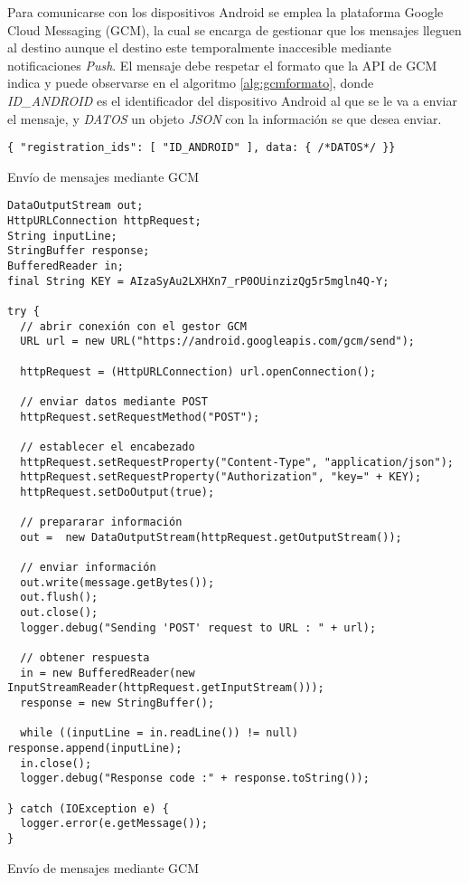 Para comunicarse con los dispositivos Android se emplea la plataforma Google Cloud Messaging (GCM), la cual se encarga de gestionar que los mensajes lleguen al destino aunque el destino este temporalmente inaccesible mediante notificaciones \emph{Push}. El mensaje debe respetar el formato que la API de GCM indica y puede observarse en el algoritmo \ref{alg:gcmformato}, donde \emph{ID\_ANDROID} es el identificador del dispositivo Android al que se le va a enviar el mensaje, y \emph{DATOS} un objeto \emph{JSON} con la información se que desea enviar.
\begin{listing}
	\begin{minipage}{.4\textwidth}
		\begin{verbatim}
{ "registration_ids": [ "ID_ANDROID" ], data: { /*DATOS*/ }}
		\end{verbatim}
	\end{minipage}
	\caption{Envío de mensajes mediante GCM}\label{alg:gcmformato}
\end{listing}

\begin{listing}
	\begin{minipage}{.4\textwidth}
		\begin{verbatim}
DataOutputStream out;
HttpURLConnection httpRequest;
String inputLine;
StringBuffer response;
BufferedReader in;
final String KEY = AIzaSyAu2LXHXn7_rP0OUinzizQg5r5mgln4Q-Y;

try {
  // abrir conexión con el gestor GCM
  URL url = new URL("https://android.googleapis.com/gcm/send");

  httpRequest = (HttpURLConnection) url.openConnection();

  // enviar datos mediante POST
  httpRequest.setRequestMethod("POST");

  // establecer el encabezado
  httpRequest.setRequestProperty("Content-Type", "application/json");
  httpRequest.setRequestProperty("Authorization", "key=" + KEY);
  httpRequest.setDoOutput(true);

  // prepararar información
  out =  new DataOutputStream(httpRequest.getOutputStream());

  // enviar información
  out.write(message.getBytes());
  out.flush();
  out.close();
  logger.debug("Sending 'POST' request to URL : " + url);

  // obtener respuesta
  in = new BufferedReader(new InputStreamReader(httpRequest.getInputStream()));
  response = new StringBuffer();

  while ((inputLine = in.readLine()) != null) response.append(inputLine);
  in.close();
  logger.debug("Response code :" + response.toString());

} catch (IOException e) {
  logger.error(e.getMessage());
}
		\end{verbatim}
	\end{minipage}
	\caption{Envío de mensajes mediante GCM}\label{alg:proximidadVehiculos}
\end{listing}

